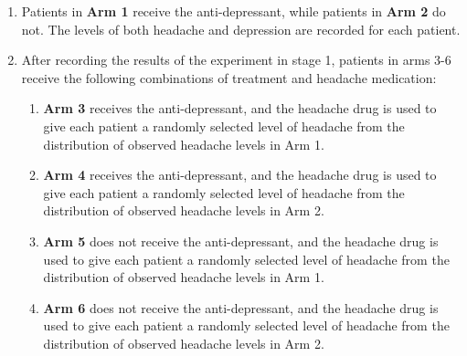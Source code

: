 \begin{experiment}\label{exp:one_mediator}
\indent 
\begin{enumerate}[noitemsep,topsep=0pt]
	\item Patients in \textbf{Arm 1} receive the anti-depressant, while patients in \textbf{Arm 2} do not. 
	The levels of both headache and depression are recorded for each patient.
	\item After recording the results of the experiment in stage 1, patients in arms 3-6 receive the following
	combinations of treatment and headache medication: 
	\begin{enumerate}[noitemsep,topsep=0pt]
		\item \textbf{Arm 3} receives the anti-depressant, and the headache drug is used to give each patient 
		a randomly selected level of headache from the distribution of observed headache levels in Arm 1. 
		\item \textbf{Arm 4} receives the anti-depressant, and the headache drug is used to give each patient 
		a randomly selected level of headache from the distribution of observed headache levels in Arm 2. 
		\item \textbf{Arm 5} does not receive the anti-depressant, and the headache drug is used to give each patient 
		a randomly selected level of headache from the distribution of observed headache levels in Arm 1. 
		\item \textbf{Arm 6} does not receive the anti-depressant, and the headache drug is used to give each patient 
		a randomly selected level of headache from the distribution of observed headache levels in Arm 2. 
	\end{enumerate}
\end{enumerate}
\end{experiment}

